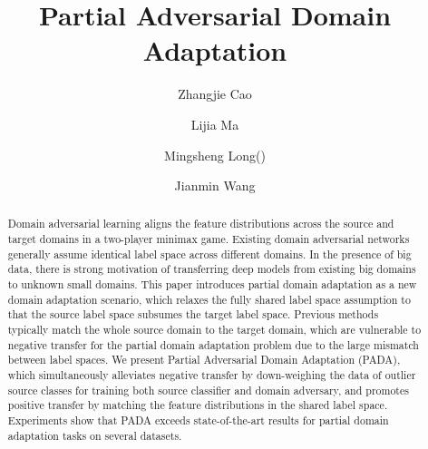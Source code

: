 \documentclass[runningheads]{llncs}
\begin{document}
\title{Partial Adversarial Domain Adaptation}



\author{Zhangjie Cao 
\and Lijia Ma
\and Mingsheng Long(\Letter)
\and Jianmin Wang
}


\maketitle

\begin{abstract}
Domain adversarial learning aligns the feature distributions across the source and target domains in a two-player minimax game. Existing domain adversarial networks generally assume identical label space across different domains. In the presence of big data, there is strong motivation of transferring deep models from existing big domains to unknown small domains. This paper introduces partial domain adaptation as a new domain adaptation scenario, which relaxes the fully shared label space assumption to that the source label space subsumes the target label space. Previous methods typically match the whole source domain to the target domain, which are vulnerable to negative transfer for the partial domain adaptation problem due to the large mismatch between label spaces. We present Partial Adversarial Domain Adaptation (PADA), which simultaneously alleviates negative transfer by down-weighing the data of outlier source classes for training both source classifier and domain adversary, and promotes positive transfer by matching the feature distributions in the shared label space. Experiments show that PADA exceeds state-of-the-art results for partial domain adaptation tasks on several datasets.
\end{abstract}
\end{document}
